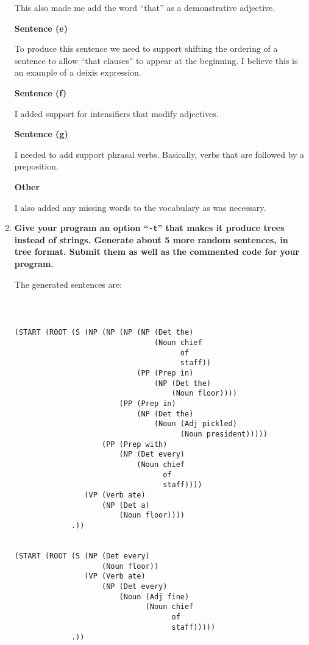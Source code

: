 \documentclass[10pt]{article}
\begin{document}
\begin{enumerate}
This also made me add the word ``that'' as a demonstrative adjective.

{\bf Sentence (e)}

To produce this sentence we need to support shifting the ordering of a sentence to allow ``that clauses'' to appear at the beginning. I believe this is an example of a deixis expression.

{\bf Sentence (f)}

I added support for intensifiers that modify adjectives.

{\bf Sentence (g)}

I needed to add support phrasal verbs. Basically, verbs that are followed by a preposition. 

{\bf Other}

I also added any missing words to the vocabulary as was necessary.


\item {\bf Give your program an option ``\verb|-t|'' that makes it produce
  trees instead of strings. Generate about 5 more random
sentences, in tree format. Submit them as well as the commented code
for your program.} 

The generated sentences are:

{\tt
\begin{verbatim}

(START (ROOT (S (NP (NP (NP (NP (Det the)
                                (Noun chief
                                      of
                                      staff))
                            (PP (Prep in)
                                (NP (Det the)
                                    (Noun floor))))
                        (PP (Prep in)
                            (NP (Det the)
                                (Noun (Adj pickled)
                                      (Noun president)))))
                    (PP (Prep with)
                        (NP (Det every)
                            (Noun chief
                                  of
                                  staff))))
                (VP (Verb ate)
                    (NP (Det a)
                        (Noun floor))))
             .))


(START (ROOT (S (NP (Det every)
                    (Noun floor))
                (VP (Verb ate)
                    (NP (Det every)
                        (Noun (Adj fine)
                              (Noun chief
                                    of
                                    staff)))))
             .))



\end{verbatim}}
\end{enumerate}
\end{document}
